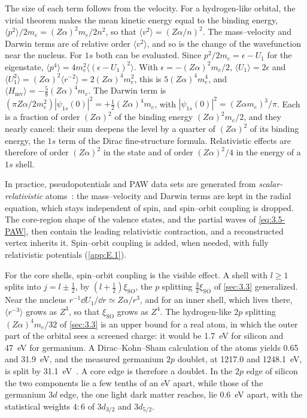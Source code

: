 The size of each term follows from the velocity. For a hydrogen-like orbital, the virial theorem makes the mean kinetic energy equal to the binding energy, $\langle p^2\rangle/2m_e = (Z\alpha)^2m_e/2n^2$, so that $\langle v^2\rangle = (Z\alpha/n)^2$. The mass--velocity and Darwin terms are of relative order $\langle v^2\rangle$, and so is the change of the wavefunction near the nucleus. For $1s$ both can be evaluated. Since $p^2/2m_e = \epsilon - U_1$ for the eigenstate, $\langle p^4\rangle = 4m_e^2\langle(\epsilon - U_1)^2\rangle$. With $\epsilon = -(Z\alpha)^2m_e/2$, $\langle U_1\rangle = 2\epsilon$ and $\langle U_1^2\rangle = (Z\alpha)^2\langle r^{-2}\rangle = 2(Z\alpha)^4m_e^2$, this is $5(Z\alpha)^4m_e^4$, and $\langle H_{\mathrm{mv}}\rangle = -\tfrac58(Z\alpha)^4m_e$. The Darwin term is $(\pi Z\alpha/2m_e^2)|\psi_{1s}(0)|^2 = +\tfrac12(Z\alpha)^4m_e$, with $|\psi_{1s}(0)|^2 = (Z\alpha m_e)^3/\pi$. Each is a fraction of order $(Z\alpha)^2$ of the binding energy $(Z\alpha)^2m_e/2$, and they nearly cancel: their sum deepens the level by a quarter of $(Z\alpha)^2$ of its binding energy, the $1s$ term of the Dirac fine-structure formula. Relativistic effects are therefore of order $(Z\alpha)^2$ in the state and of order $(Z\alpha)^2/4$ in the energy of a $1s$ shell.

In practice, pseudopotentials and PAW data sets are generated from \emph{scalar-relativistic} atoms~\cite{koelling1977technique}: the mass--velocity and Darwin terms are kept in the radial equation, which stays independent of spin, and spin--orbit coupling is dropped. The core-region shape of the valence states, and the partial waves of \cref{eq:3.5-PAW}, then contain the leading relativistic contraction, and a reconstructed vertex inherits it. Spin--orbit coupling is added, when needed, with fully relativistic potentials (\cref{app:E.1}).

For the core shells, spin--orbit coupling is the visible effect. A shell with $l \ge 1$ splits into $j = l \pm \tfrac12$, by $(l + \tfrac12)\xi_{\mathrm{SO}}$, the $p$ splitting $\tfrac32\xi_{\mathrm{SO}}$ of \cref{sec:3.3} generalized. Near the nucleus $r^{-1}\dd U_1/\dd r \simeq Z\alpha/r^3$, and for an inner shell, which lives there, $\langle r^{-3}\rangle$ grows as $Z^3$, so that $\xi_{\mathrm{SO}}$ grows as $Z^4$. The hydrogen-like $2p$ splitting $(Z\alpha)^4m_e/32$ of \cref{sec:3.3} is an upper bound for a real atom, in which the outer part of the orbital sees a screened charge: it would be \SI{1.7}{eV} for silicon and \SI{47}{eV} for germanium. A Dirac--Kohn--Sham calculation of the atoms yields 0.65 and \SI{31.9}{eV}, and the measured germanium $2p$ doublet, at 1217.0 and \SI{1248.1}{eV}, is split by \SI{31.1}{eV}~\cite[Table~1-1]{williams2009electron}. A core edge is therefore a doublet. In the $2p$ edge of silicon the two components lie a few tenths of an eV apart, while those of the germanium $3d$ edge, the one light dark matter reaches, lie \SI{0.6}{eV} apart, with the statistical weights $4:6$ of $3d_{3/2}$ and $3d_{5/2}$.

